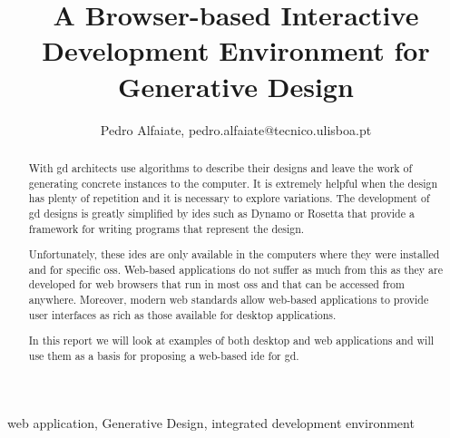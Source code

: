 \documentclass{./llncs2e/llncs}
\begin{document}
	
\setcounter{tocdepth}{2}
\makeatletter
\renewcommand*\l@author[2]{}
\renewcommand*\l@title[2]{}
\makeatother
	
	
\title{A Browser-based Interactive Development Environment for Generative Design}

\author{Pedro Alfaiate, pedro.alfaiate@tecnico.ulisboa.pt}

\maketitle

\begin{abstract}
	
	With \ac{gd} architects use algorithms to describe their designs and leave the work of generating concrete instances to the computer.
	It is extremely helpful when the design has plenty of repetition and it is necessary to explore variations.
	The development of \ac{gd} designs is greatly simplified by \acp{ide} such as Dynamo or Rosetta that provide a framework for writing programs that represent the design.

	Unfortunately, these \acp{ide} are only available in the computers where they were installed and for specific \acp{os}.
	Web-based applications do not suffer as much from this as they are developed for web browsers that run in most \acp{os} and that can be accessed from anywhere. 
	Moreover, modern web standards allow web-based applications to provide user interfaces as rich as those available for desktop applications.

	In this report we will look at examples of both desktop and web applications and will use them as a basis for proposing a web-based \ac{ide} for \ac{gd}.
\end{abstract}
\begin{keywords}
web application, Generative Design, integrated development environment
\end{keywords}
\end{document}
